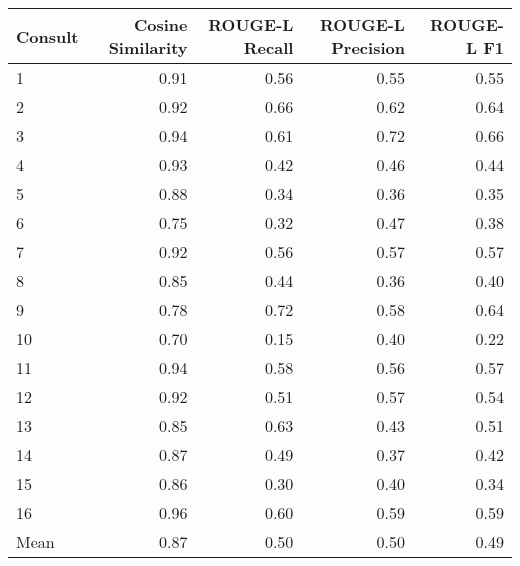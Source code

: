 \begin{tabular}{lrrrr}
\toprule
Consult & Cosine Similarity & ROUGE-L Recall & ROUGE-L Precision & ROUGE-L F1 \\
\midrule
1 & 0.91 & 0.56 & 0.55 & 0.55 \\
2 & 0.92 & 0.66 & 0.62 & 0.64 \\
3 & 0.94 & 0.61 & 0.72 & 0.66 \\
4 & 0.93 & 0.42 & 0.46 & 0.44 \\
5 & 0.88 & 0.34 & 0.36 & 0.35 \\
6 & 0.75 & 0.32 & 0.47 & 0.38 \\
7 & 0.92 & 0.56 & 0.57 & 0.57 \\
8 & 0.85 & 0.44 & 0.36 & 0.40 \\
9 & 0.78 & 0.72 & 0.58 & 0.64 \\
10 & 0.70 & 0.15 & 0.40 & 0.22 \\
11 & 0.94 & 0.58 & 0.56 & 0.57 \\
12 & 0.92 & 0.51 & 0.57 & 0.54 \\
13 & 0.85 & 0.63 & 0.43 & 0.51 \\
14 & 0.87 & 0.49 & 0.37 & 0.42 \\
15 & 0.86 & 0.30 & 0.40 & 0.34 \\
16 & 0.96 & 0.60 & 0.59 & 0.59 \\
Mean & 0.87 & 0.50 & 0.50 & 0.49 \\
\bottomrule
\end{tabular}
